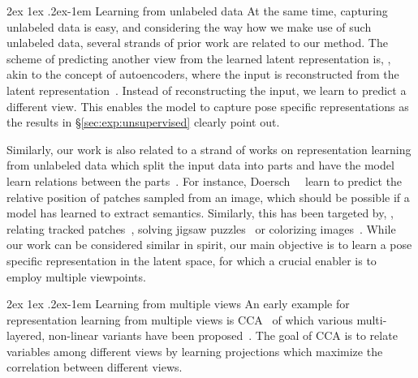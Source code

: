 \documentclass[10pt,twocolumn,letterpaper]{article}
\makeatletter
\renewcommand{\paragraph}{%
  \@startsection{paragraph}{4}%
  {\z@}{2ex \@plus 1ex \@minus .2ex}{-1em}%
  {\normalfont\normalsize\bfseries}%
}
\makeatother
\begin{document}
\paragraph{Learning from unlabeled data}
At the same time, capturing unlabeled data is easy, and 
considering the way how we make use of such unlabeled data,
several strands of prior work are related to our method.
The scheme of predicting another view from the learned latent representation 
is, \eg, akin to the concept of autoencoders,
where the input is reconstructed from the latent 
representation~\cite{Hinton2006science_autoenc,Vincent08icml}.
Instead of reconstructing the input, we learn to predict a different view.
This enables the model to capture pose specific representations 
as the results in \S\ref{sec:exp:unsupervised} clearly point out.

Similarly, our work is also related to a strand of works on 
representation learning from unlabeled data
which split the input data into parts and 
have the model learn relations between the 
parts~\cite{Doersch2015iccv_contextprediction,Owens2016eccv_audioselfsupervision,
Pathak2016cvpr_contextencoders,
Zamir2016eccv_3drepresentation,
Zhang2017cvpr_splitbrainautoenc}.
For instance, Doersch~\etal~\cite{Doersch2015iccv_contextprediction} 
learn to predict the relative position of patches sampled from an image,
which should be possible if a model has learned to extract semantics.
Similarly, this has been targeted
by, \eg, relating tracked patches~\cite{Wang15iccv}, 
solving jigsaw puzzles~\cite{Noroozi2016eccv_jigsawpuzzle}
or colorizing images~\cite{Larsson2016eccv}.
While our work can be considered similar in spirit,
our main objective is to learn a pose specific representation in the latent space,
for which a crucial enabler is to employ multiple viewpoints.

\paragraph{Learning from multiple views}
An early example for representation learning from multiple views is 
\ac{CCA}~\cite{Hotelling1936biometrica_cca}
of which various multi-layered, non-linear variants have been 
proposed~\cite{Andrew2013icml_deepcca,Becker1992nature,
Li2016arxiv_multiview,Wang2015icml_deepmultiview_dccae}.
The goal of \ac{CCA} is to relate variables among different views
by learning projections which maximize the correlation between different views.
\end{document}
